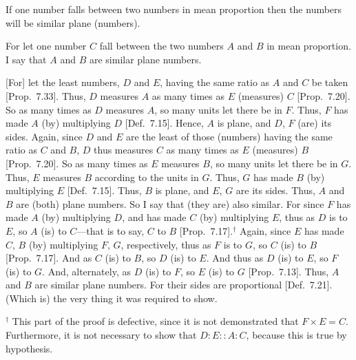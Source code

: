 \begin{Parallel}{}{}
{If one number falls between two
numbers in mean proportion then the numbers will be similar plane (numbers).

For let one number $C$ fall  between the two numbers $A$
and $B$ in mean proportion. I say that $A$ and $B$ are similar plane numbers.

\epsfysize=1in
\centerline{}

\mbox{[}For] let the least numbers, $D$ and $E$,  having the same ratio as $A$ and $C$ be taken [Prop.~7.33]. Thus,
$D$ measures $A$ as many  times as  $E$ (measures) $C$
[Prop.~7.20]. So as many times as $D$ measures $A$, so many units let there be in $F$. Thus, $F$ has made $A$ (by)
multiplying $D$ [Def.~7.15]. Hence, $A$ is 
plane, and $D$, $F$ (are) its sides. Again, since $D$ and $E$
are the least of those (numbers) having  the same ratio as $C$ and $B$, 
$D$ thus measures $C$ as many times as $E$ (measures) $B$ [Prop.~7.20]. So as many times as $E$ measures
$B$, so many units let there be in $G$. Thus, $E$ measures $B$ according to
the units in $G$. Thus, $G$ has made $B$ (by) multiplying $E$ [Def.~7.15]. Thus, $B$ is plane, and $E$, $G$ are its sides. Thus, $A$ and $B$ are (both) plane numbers. So I say that
(they are) also similar. For since $F$ has made $A$ (by) multiplying $D$,
and has made $C$ (by) multiplying $E$, thus as $D$ is to $E$, so $A$ (is) to $C$---that is to say, $C$ to $B$ [Prop.~7.17].$^\dag$ Again, since $E$ has made  $C$, $B$ (by)
multiplying  $F$, $G$, respectively, thus as $F$ is to $G$, so $C$ (is) to
$B$ [Prop.~7.17]. And as $C$ (is) to $B$, so
$D$ (is) to $E$. And thus as $D$ (is) to $E$, so $F$ (is) to $G$. And,
alternately, as $D$ (is) to $F$, so $E$ (is) to $G$ [Prop.~7.13]. Thus, $A$ and $B$ are similar plane
numbers. For their sides are proportional [Def.~7.21].
(Which is) the very thing it was required to show.}
\end{Parallel}
{\footnotesize\noindent$^\dag$ This part of the proof is defective, since it is not demonstrated that $F\times E = C$. Furthermore, it is
not necessary to show that $D:E::A:C$, because this
is true by hypothesis.}

